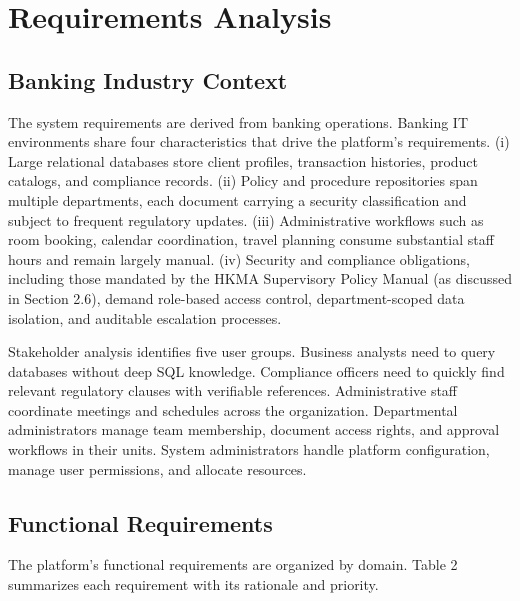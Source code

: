 \section{Requirements Analysis}

\subsection{Banking Industry Context}

The system requirements are derived from banking operations. Banking IT environments share four characteristics that drive the platform's requirements. (i) Large relational databases store client profiles, transaction histories, product catalogs, and compliance records. (ii) Policy and procedure repositories span multiple departments, each document carrying a security classification and subject to frequent regulatory updates. (iii) Administrative workflows such as room booking, calendar coordination, travel planning consume substantial staff hours and remain largely manual. (iv) Security and compliance obligations, including those mandated by the HKMA Supervisory Policy Manual (as discussed in Section 2.6), demand role-based access control, department-scoped data isolation, and auditable escalation processes.

Stakeholder analysis identifies five user groups. Business analysts need to query databases without deep SQL knowledge. Compliance officers need to quickly find relevant regulatory clauses with verifiable references. Administrative staff coordinate meetings and schedules across the organization. Departmental administrators manage team membership, document access rights, and approval workflows in their units. System administrators handle platform configuration, manage user permissions, and allocate resources.

\subsection{Functional Requirements}

The platform's functional requirements are organized by domain. Table 2 summarizes each requirement with its rationale and priority.

